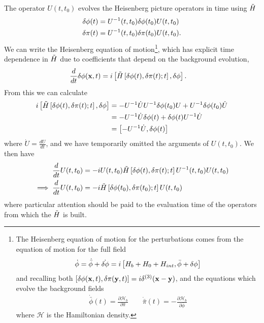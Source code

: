 The operator $U(t,t_0)$ evolves the Heisenberg picture operators in time
using $\tilde{H}$
\begin{align}
    \delta\phi(t) &= U^{-1}(t,t_0)\delta\phi(t_0)U(t,t_0)\\
    \delta\pi(t) &= U^{-1}(t,t_0)\delta\pi(t_0)U(t,t_0).
\end{align}
We can write the Heisenberg equation of motion\footnote{
    The Heisenberg equation of motion for the perturbations
    comes from the equation of motion for the full field
    \begin{align}
        \dot{\phi}=\dot{\bar{\phi}}+\dot{\delta\phi}
        =i\left[H_b + H_0 + H_{int}, \bar{\phi}+\delta\phi\right]
    \end{align}
    and recalling both $\left[\delta\phi(\mathbf{x},t),\delta\pi(\mathbf{y},t)\right]=i\delta^{(3)}(\mathbf{x}-\mathbf{y})$,
    and the equations which evolve the background fields
    \begin{align}
        \dot{\bar{\phi}}(t)=\frac{\partial\mathcal{H}_b}{\partial\bar{\pi}}\qquad
        \dot{\bar{\pi}}(t)=-\frac{\partial\mathcal{H}_b}{\partial\bar{\phi}}
    \end{align}
    where $\mathcal{H}$ is the Hamiltonian density.
}, which has
explicit time dependence in $\tilde{H}$ due to coefficients
that depend on the background evolution,
\begin{align}
    \frac{d}{dt}\delta\phi(\mathbf{x},t) &= i\left[\tilde{H}\left[\delta\phi(t),\delta\pi(t);t\right],\delta\phi\right].\label{heis_phi}
\end{align}
From this we can calculate
\begin{align}
    i\left[\tilde{H}\left[\delta\phi(t),\delta\pi(t);t\right],\delta\phi\right]
    &= -U^{-1}\dot{U}U^{-1}\delta\phi(t_0) U+U^{-1}\delta\phi(t_0) \dot{U}\\
    &= -U^{-1}\dot{U}\delta\phi(t)+\delta\phi(t)U^{-1} \dot{U}\\
    &= \left[-U^{-1}\dot{U},\delta\phi(t)\right]
\end{align}
where $\dot{U}=\frac{dU}{dt}$,
and we have temporarily omitted the arguments of $U(t,t_0)$.
We then have
\begin{align}
    \frac{d}{dt}U(t,t_0) &= -iU(t,t_0)\tilde{H}\left[\delta\phi(t),\delta\pi(t);t\right]U^{-1}(t,t_0)U(t,t_0)\\
    \implies \frac{d}{dt}U(t,t_0) &= -i\tilde{H}\left[\delta\phi(t_0),\delta\pi(t_0);t\right]U(t,t_0)\label{u_def}
\end{align}
where particular attention should be paid to the evaluation time of the operators from
which the $\tilde{H}$ is built.


